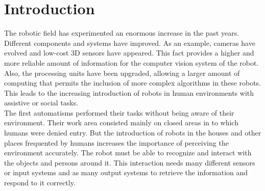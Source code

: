 \chapter{Introduction}
The robotic field has experimented an enormous increase in the past years. 
Different components and systems have improved.
As an example, cameras have evolved and low-cost 3D sensors have appeared. 
This fact provides a higher and more reliable amount of information for the computer vision system of the robot.  
Also, the processing units have been upgraded, allowing a larger amount of computing that permits the inclusion of more complex algorithms in these robots.  
This leads to the increasing introduction of robots in human environments with assistive or social tasks. 
\\


The first automatisms performed their tasks without being aware of their environment. 
Their work area consisted mainly on closed areas in to which humans were denied entry. 
But the introduction of robots in the houses and other places frequented by humans increases the importance of perceiving the environment accurately. 
The robot must be able to recognize and interact with the objects and persons around it. 
This interaction needs many different sensors or input systems and as many output systems to retrieve the information and respond to it correctly.  
\\


